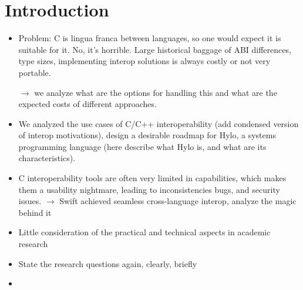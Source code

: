 \section{Introduction}
\begin{itemize}
    \item Problem: C is lingua franca between languages, so one would expect it is suitable for it. No, it's horrible. Large historical baggage of ABI differences, type sizes, implementing interop solutions is always costly or not very portable. 
    
    
    $\rightarrow$ we analyze what are the options for handling this and what are the expected costs of different approaches.
    
    \item We analyzed the use cases of C/C++ interoperability (add condensed version of interop motivations), design a desirable roadmap for Hylo, a systems programming language (here describe what Hylo is, and what are its characteristics).
    
    \item C interoperability tools are often very limited in capabilities, which makes them a usability nightmare, leading to inconsistencies bugs, and security issues.
    $\rightarrow$ Swift achieved seamless cross-language interop, analyze the magic behind it
    \item Little consideration of the practical and technical aspects in academic research
    

    \item State the research questions again, clearly, briefly
    \item 
\end{itemize}

\bigbreak \bigbreak \bigbreak
